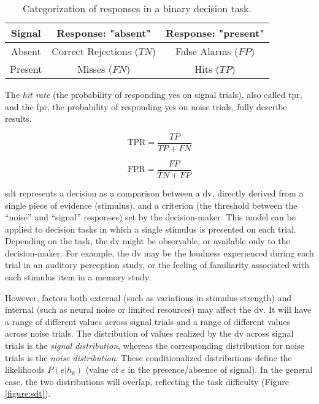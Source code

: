 \begin{table}[h!]
    \centering
    \begin{tabular}{ ||c||c|c|| }
        \hline
        Signal  & Response: "absent"        & Response: "present" \\
        \hline\hline
        Absent  & Correct Rejections ($TN$) & False Alarms ($FP$) \\
        \hline
        Present & Misses ($FN$)             & Hits ($TP$)         \\
        \hline
    \end{tabular}
    \caption{Categorization of responses in a binary decision task.}
    \label{table:1}
\end{table}

The \textit{hit rate} (the probability of responding yes on signal trials), also called \acrfull{tpr}, and the \acrfull{fpr}, the probability of responding yes on noise trials, fully describe results.

$$\text{TPR} = \frac{TP}{TP + FN}$$

$$\text{FPR} = \frac{FP}{TN+FP}$$

\acrshort{sdt} represents a decision as a comparison between a \acrfull{dv}, directly derived from a single piece of evidence (stimulus), and a criterion (the threshold between the “noise” and “signal” responses) set by the decision-maker. This model can be applied to decision tasks in which a single stimulus is presented on each trial. Depending on the task, the \acrshort{dv} might be observable, or available only to the decision-maker. For example, the \acrshort{dv} may be the loudness experienced during each trial in an auditory perception study, or the feeling of familiarity associated with each stimulus item in a memory study.

However, factors both external (such as variations in stimulus strength) and internal (such as neural noise or limited resources) may affect the \acrshort{dv}. It will have a range of different values across signal trials and a range of different values across noise trials. The distribution of values realized by the \acrshort{dv} across signal trials is the \textit{signal distribution}, whereas the corresponding distribution for noise trials is the \textit{noise distribution}. These conditionalized distributions define the likelihoods $P(e|h_k)$ (value of $e$ in the presence/absence of signal). In the general case, the two distributions will overlap, reflecting the task difficulty (Figure \ref{figure:sdt}).

